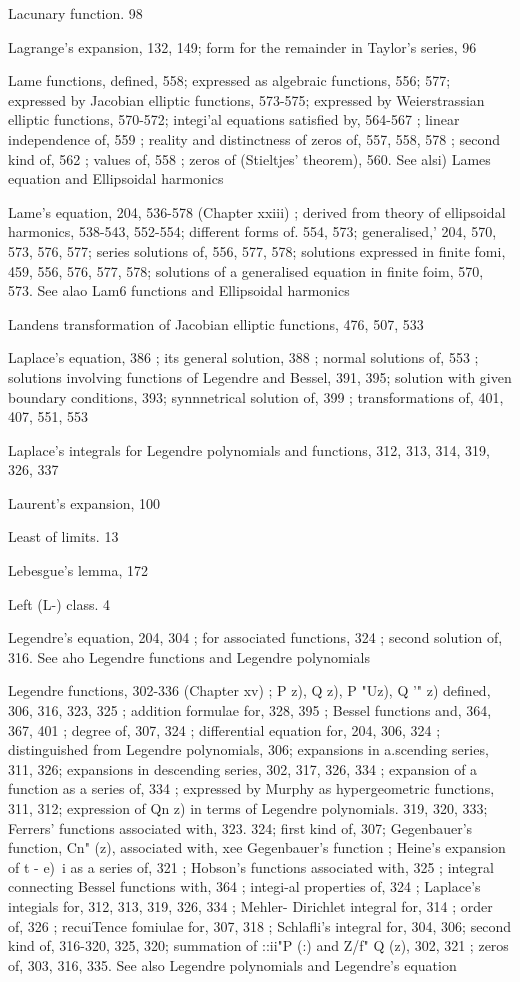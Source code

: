 Lacunary function. 98

Lagrange's expansion, 132, 149; form for the remainder in Taylor's series, 96

Lame functions, defined, 558; expressed as algebraic functions, 556; 577; expressed by Jacobian
elliptic functions, 573-575; expressed by Weierstrassian elliptic functions, 570-572; integi'al
equations satisfied by, 564-567 ; linear independence of, 559 ; reality and distinctness of
zeros of, 557, 558, 578 ; second kind of, 562 ; values of, 558 ; zeros of (Stieltjes' theorem),
560. See alsi) Lames equation and Ellipsoidal harmonics

Lame's equation, 204, 536-578 (Chapter xxiii) ; derived from theory of ellipsoidal harmonics,
538-543, 552-554; different forms of. 554, 573; generalised,' 204, 570, 573, 576, 577;
series solutions of, 556, 577, 578; solutions expressed in finite fomi, 459, 556, 576, 577, 578;
solutions of a generalised equation in finite foim, 570, 573. See alao Lam6 functions and
Ellipsoidal harmonics

Landens transformation of Jacobian elliptic functions, 476, 507, 533

Laplace's equation, 386 ; its general solution, 388 ; normal solutions of, 553 ; solutions involving
functions of Legendre and Bessel, 391, 395; solution with given boundary conditions, 393;
synnnetrical solution of, 399 ; transformations of, 401, 407, 551, 553

Laplace's integrals for Legendre polynomials and functions, 312, 313, 314, 319, 326, 337

Laurent's expansion, 100

Least of limits. 13

Lebesgue's lemma, 172

Left (L-) class. 4

Legendre's equation, 204, 304 ; for associated functions, 324 ; second solution of, 316. See aho
Legendre functions and Legendre polynomials

Legendre functions, 302-336 (Chapter xv) ; P  z), Q  z), P "Uz), Q '" z) defined, 306, 316, 323,
325 ; addition formulae for, 328, 395 ; Bessel functions and, 364, 367, 401 ; degree of, 307,
324 ; differential equation for, 204, 306, 324 ; distinguished from Legendre polynomials,
306; expansions in a.scending series, 311, 326; expansions in descending series, 302, 317,
326, 334 ; expansion of a function as a series of, 334 ; expressed by Murphy as hypergeometric
functions, 311, 312; expression of Qn z) in terms of Legendre polynomials. 319, 320, 333;
Ferrers' functions associated with, 323. 324; first kind of, 307; Gegenbauer's function,
Cn" (z), associated with, xee Gegenbauer's function ; Heine's expansion of  t - e)~i as a series
of, 321 ; Hobson's functions associated with, 325 ; integral connecting Bessel functions with,
364 ; integi-al properties of, 324 ; Laplace's integials for, 312, 313, 319, 326, 334 ; Mehler-
Dirichlet integral for, 314 ; order of, 326 ; recuiTence fomiulae for, 307, 318 ; Schlafli's
integral for, 304, 306; second kind of, 316-320, 325, 320; summation of ::ii"P (:) and
Z/f" Q  (z), 302, 321 ; zeros of, 303, 316, 335. See also Legendre polynomials and Legendre's
equation

